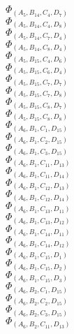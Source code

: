 \documentclass[14pt]{article}
\begin{document}
    $\Phi_{({A}_{5}, {B}_{14}, {C}_{4}, {D}_{7})}$ \\ 
    $\Phi_{({A}_{5}, {B}_{14}, {C}_{4}, {D}_{8})}$ \\ 
    $\Phi_{({A}_{5}, {B}_{14}, {C}_{7}, {D}_{4})}$ \\ 
    $\Phi_{({A}_{5}, {B}_{14}, {C}_{8}, {D}_{4})}$ \\ 
    $\Phi_{({A}_{5}, {B}_{15}, {C}_{4}, {D}_{6})}$ \\ 
    $\Phi_{({A}_{5}, {B}_{15}, {C}_{6}, {D}_{4})}$ \\ 
    $\Phi_{({A}_{5}, {B}_{15}, {C}_{7}, {D}_{7})}$ \\ 
    $\Phi_{({A}_{5}, {B}_{15}, {C}_{7}, {D}_{8})}$ \\ 
    $\Phi_{({A}_{5}, {B}_{15}, {C}_{8}, {D}_{7})}$ \\ 
    $\Phi_{({A}_{5}, {B}_{15}, {C}_{8}, {D}_{8})}$ \\ 
    $\Phi_{({A}_{6}, {B}_{1}, {C}_{1}, {D}_{15})}$ \\ 
    $\Phi_{({A}_{6}, {B}_{1}, {C}_{2}, {D}_{15})}$ \\ 
    $\Phi_{({A}_{6}, {B}_{1}, {C}_{3}, {D}_{15})}$ \\ 
    $\Phi_{({A}_{6}, {B}_{1}, {C}_{11}, {D}_{13})}$ \\ 
    $\Phi_{({A}_{6}, {B}_{1}, {C}_{11}, {D}_{14})}$ \\ 
    $\Phi_{({A}_{6}, {B}_{1}, {C}_{12}, {D}_{13})}$ \\ 
    $\Phi_{({A}_{6}, {B}_{1}, {C}_{12}, {D}_{14})}$ \\ 
    $\Phi_{({A}_{6}, {B}_{1}, {C}_{13}, {D}_{11})}$ \\ 
    $\Phi_{({A}_{6}, {B}_{1}, {C}_{13}, {D}_{12})}$ \\ 
    $\Phi_{({A}_{6}, {B}_{1}, {C}_{14}, {D}_{11})}$ \\ 
    $\Phi_{({A}_{6}, {B}_{1}, {C}_{14}, {D}_{12})}$ \\ 
    $\Phi_{({A}_{6}, {B}_{1}, {C}_{15}, {D}_{1})}$ \\ 
    $\Phi_{({A}_{6}, {B}_{1}, {C}_{15}, {D}_{2})}$ \\ 
    $\Phi_{({A}_{6}, {B}_{1}, {C}_{15}, {D}_{3})}$ \\ 
    $\Phi_{({A}_{6}, {B}_{2}, {C}_{1}, {D}_{15})}$ \\ 
    $\Phi_{({A}_{6}, {B}_{2}, {C}_{2}, {D}_{15})}$ \\ 
    $\Phi_{({A}_{6}, {B}_{2}, {C}_{3}, {D}_{15})}$ \\ 
    $\Phi_{({A}_{6}, {B}_{2}, {C}_{11}, {D}_{13})}$ \\ 
\end{document}
